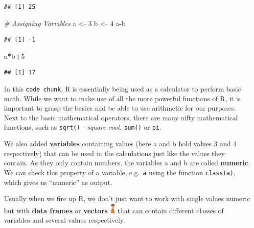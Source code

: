 \documentclass[
]{book}
\newenvironment{Shaded}{\begin{snugshade}}{\end{snugshade}}
\newcommand{\CommentTok}[1]{\textcolor[rgb]{0.56,0.35,0.01}{\textit{#1}}}
\newcommand{\DecValTok}[1]{\textcolor[rgb]{0.00,0.00,0.81}{#1}}
\newcommand{\NormalTok}[1]{#1}
\newcommand{\OtherTok}[1]{\textcolor[rgb]{0.56,0.35,0.01}{#1}}
\newcommand{\SpecialCharTok}[1]{\textcolor[rgb]{0.81,0.36,0.00}{\textbf{#1}}}
\begin{document}
\begin{verbatim}
## [1] 25
\end{verbatim}

\begin{Shaded}
\begin{Highlighting}[]
\CommentTok{\# Assigning Variables}
\NormalTok{a }\OtherTok{\textless{}{-}} \DecValTok{3}
\NormalTok{b }\OtherTok{\textless{}{-}} \DecValTok{4}
\NormalTok{a}\SpecialCharTok{{-}}\NormalTok{b}
\end{Highlighting}
\end{Shaded}

\begin{verbatim}
## [1] -1
\end{verbatim}

\begin{Shaded}
\begin{Highlighting}[]
\NormalTok{a}\SpecialCharTok{*}\NormalTok{b}\SpecialCharTok{+}\DecValTok{5}
\end{Highlighting}
\end{Shaded}

\begin{verbatim}
## [1] 17
\end{verbatim}

In this \texttt{code\ chunk}, R is essentially being used as a calculator to perform basic math.
While we want to make use of all the more powerful functions of R, it is important to grasp the basics and be able to use arithmetic for our purposes.
Next to the basic mathematical operators, there are many nifty mathematical functions, such as \texttt{sqrt()} - \emph{square root}, \texttt{sum()} or \texttt{pi}.

We also added \textbf{variables} containing values (here a and b hold values 3 and 4 respectively) that can be used in the calculations just like the values they contain.
As they only contain numbers, the variables a and b are called \textbf{numeric}.
We can check this property of a variable, e.g.~\texttt{a} using the function \texttt{class(a)}, which gives us ``numeric'' as output.

Usually when we fire up R, we don't just want to work with single values numeric but with \textbf{data frames} or \textbf{vectors} \includegraphics[width=\textwidth,height=0.20833in]{./img/vector.png} that can contain different classes of variables and several values respectively.
\end{document}
